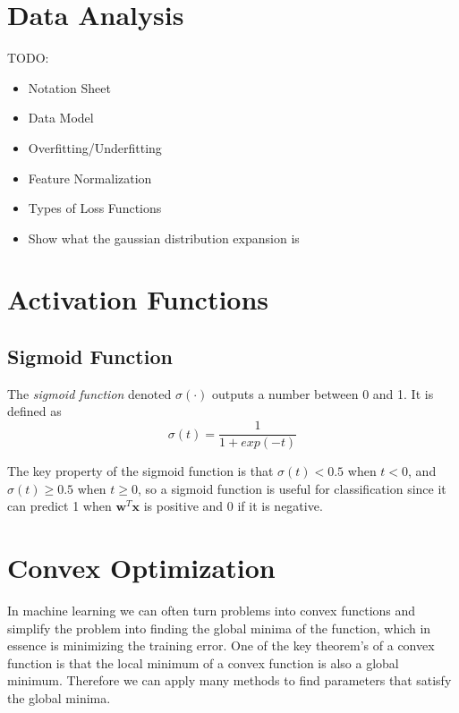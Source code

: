 \documentclass[12pt]{article}
\begin{document}
\newpage

\section{Data Analysis}
TODO:
\begin{itemize}
    \item Notation Sheet
    \item Data Model
    \item Overfitting/Underfitting
    \item Feature Normalization
    \item Types of Loss Functions
    \item Show what the gaussian distribution expansion is
\end{itemize}

\section{Activation Functions}
    \subsection{Sigmoid Function}
        The \textit{sigmoid function} denoted $\sigma(\cdot)$ outputs a number between 0 and 1. It is defined as
        $$ \sigma(t) = \frac{1}{1 + exp(-t)} $$


        The key property of the sigmoid function is that $\sigma(t) < 0.5$ when $t < 0$, and $\sigma(t) \geq 0.5$ when $t \geq 0$, so a sigmoid function is useful for classification since it can predict 1 when $\boldsymbol{w}^T\boldsymbol{x}$
        is positive and 0 if it is negative.

\section{Convex Optimization}
    In machine learning we can often turn problems into convex functions and simplify the problem into finding the global minima of the function, which in essence is minimizing the training error. One of the key theorem's of a convex function is 
    that the local minimum of a convex function is also a global minimum. Therefore we can apply many methods to find parameters that satisfy the global minima.
\end{document}
